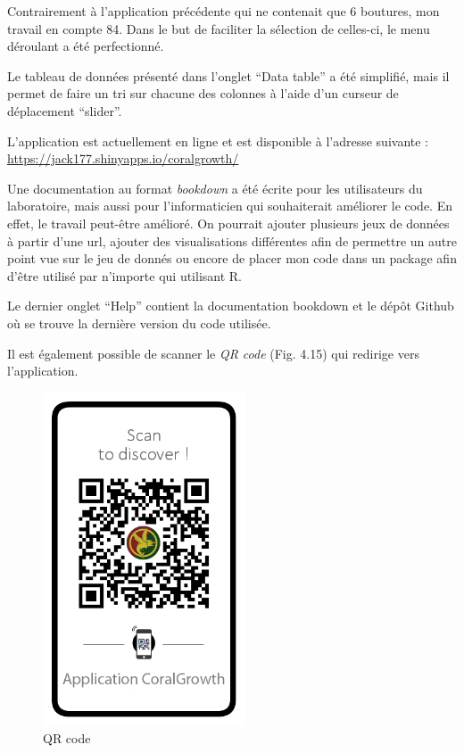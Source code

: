 \documentclass[]{article}
\begin{document}
Contrairement à l'application précédente qui ne contenait que 6
boutures, mon travail en compte 84. Dans le but de faciliter la
sélection de celles-ci, le menu déroulant a été perfectionné.

Le tableau de données présenté dans l'onglet ``Data table'' a été
simplifié, mais il permet de faire un tri sur chacune des colonnes à
l'aide d'un curseur de déplacement ``slider''.

L'application est actuellement en ligne et est disponible à l'adresse
suivante : \url{https://jack177.shinyapps.io/coralgrowth/}

Une documentation au format \emph{bookdown} a été écrite pour les
utilisateurs du laboratoire, mais aussi pour l'informaticien qui
souhaiterait améliorer le code. En effet, le travail peut-être amélioré.
On pourrait ajouter plusieurs jeux de données à partir d'une url,
ajouter des visualisations différentes afin de permettre un autre point
vue sur le jeu de donnés ou encore de placer mon code dans un package
afin d'être utilisé par n'importe qui utilisant R.

Le dernier onglet ``Help'' contient la documentation bookdown et le
dépôt Github où se trouve la dernière version du code utilisée.

Il est également possible de scanner le \emph{QR code} (Fig. 4.15) qui
redirige vers l'application.

\begin{figure}[h!]
\begin{centering}
\includegraphics[width=6cm]{../image/QRcode.png}
\caption{QR code}
\end{centering}
\end{figure}
\end{document}
